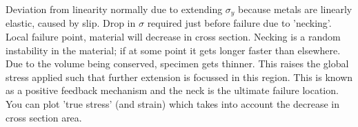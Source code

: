 \documentclass[class=report, crop=false, 12pt,a4paper]{standalone}
\begin{document}
Deviation from linearity normally due to extending \(\sigma_y\) because metals are linearly elastic, caused by slip. Drop in \(\sigma\) required just before failure due to 'necking'. Local failure point, material will decrease in cross section. Necking is a random instability in the material; if at some point it gets longer faster than elsewhere. Due to the volume being conserved, specimen gets thinner. This raises the global stress applied such that further extension is focussed in this region. This is known as a positive feedback mechanism and the neck is the ultimate failure location. You can plot 'true stress' (and strain) which takes into account the decrease in cross section area. 
\end{document}
